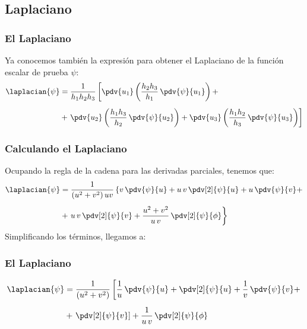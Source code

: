 \subsection{Laplaciano}
\begin{frame}
\frametitle{El Laplaciano}
Ya conocemos también la expresión para obtener el Laplaciano de la función escalar de prueba $\psi$:
\begin{align*}
\laplacian{\psi} &= \dfrac{1}{h_{1} h_{2} h_{3}} \left[ \pdv{u_{1}} \left( \dfrac{h_{2} h_{3}}{h_{1}} \, \pdv{\psi}{u_{1}} \right) + \right. \\[0.5em]
&+ \left. \pdv{u_{2}} \left( \dfrac{h_{1} h_{3}}{h_{2}} \, \pdv{\psi}{u_{2}} \right) + \pdv{u_{3}} \left( \dfrac{h_{1} h_{2}}{h_{3}} \, \pdv{\psi}{u_{3}} \right) \right] 
\end{align*}
\end{frame}
\begin{frame}
\frametitle{Calculando el Laplaciano}
Ocupando la regla de la cadena para las derivadas parciales, tenemos que:
\begin{align*}
\laplacian{\psi} &= \dfrac{1}{(u^{2} + v^{2}) \, u v} \left\{ v \, \pdv{\psi}{u} + u \, v \, \pdv[2]{\psi}{u} + u \, \pdv{\psi}{v} + \right. \\[0.5em]
&+ \left. u \, v \, \pdv[2]{\psi}{v} + \dfrac{u^{2} + v^{2}}{u \, v} \, \pdv[2]{\psi}{\phi}  \right\}
\end{align*}
\pause
Simplificando los términos, llegamos a:
\end{frame}
\begin{frame}
\frametitle{El Laplaciano}
\begin{align}
\begin{aligned}
\laplacian{\psi} &= \dfrac{1}{(u^{2} + v^{2})} \left[ \dfrac{1}{u} \, \pdv{\psi}{u} + \pdv[2]{\psi}{u} + \dfrac{1}{v} \, \pdv{\psi}{v} + \right. \\[0.5em]
&+ \left. \pdv[2]{\psi}{v} \right] + \dfrac{1}{u \, v} \, \pdv[2]{\psi}{\phi}
\end{aligned}
\label{eq:ecuacion_08}
\end{align}
\end{frame}
